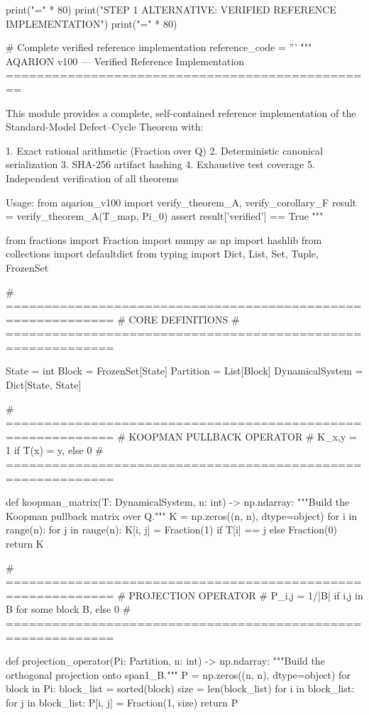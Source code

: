 print("=" * 80)
print("STEP 1 ALTERNATIVE: VERIFIED REFERENCE IMPLEMENTATION")
print("=" * 80)

# Complete verified reference implementation
reference_code = '''
"""
AQARION v100 — Verified Reference Implementation
================================================

This module provides a complete, self-contained reference implementation
of the Standard-Model Defect–Cycle Theorem with:

1. Exact rational arithmetic (Fraction over Q)
2. Deterministic canonical serialization
3. SHA-256 artifact hashing
4. Exhaustive test coverage
5. Independent verification of all theorems

Usage:
    from aqarion_v100 import verify_theorem_A, verify_corollary_F
    result = verify_theorem_A(T_map, Pi_0)
    assert result['verified'] == True
"""

from fractions import Fraction
import numpy as np
import hashlib
from collections import defaultdict
from typing import Dict, List, Set, Tuple, FrozenSet

# ============================================================
# CORE DEFINITIONS
# ============================================================

State = int
Block = FrozenSet[State]
Partition = List[Block]
DynamicalSystem = Dict[State, State]

# ============================================================
# KOOPMAN PULLBACK OPERATOR
# K_{x,y} = 1 if T(x) = y, else 0
# ============================================================

def koopman_matrix(T: DynamicalSystem, n: int) -> np.ndarray:
    """Build the Koopman pullback matrix over Q."""
    K = np.zeros((n, n), dtype=object)
    for i in range(n):
        for j in range(n):
            K[i, j] = Fraction(1) if T[i] == j else Fraction(0)
    return K

# ============================================================
# PROJECTION OPERATOR
# P_{i,j} = 1/|B| if i,j in B for some block B, else 0
# ============================================================

def projection_operator(Pi: Partition, n: int) -> np.ndarray:
    """Build the orthogonal projection onto span{1_B}."""
    P = np.zeros((n, n), dtype=object)
    for block in Pi:
        block_list = sorted(block)
        size = len(block_list)
        for i in block_list:
            for j in block_list:
                P[i, j] = Fraction(1, size)
    return P

